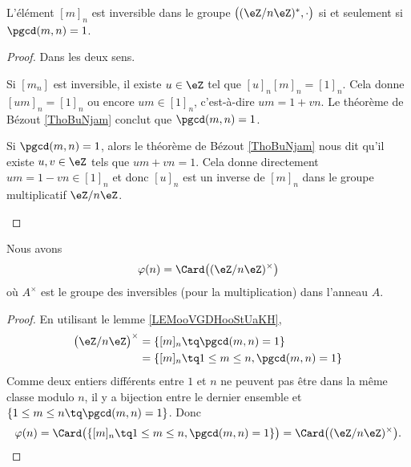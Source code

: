 \begin{lemma}		\label{LEMooVGDHooStUaKH}
	L'élément \( [m]_n\) est inversible dans le groupe \( \big( (\eZ/n\eZ)^*,\cdot \big)\) si et seulement si \( \pgcd(m,n)=1\).
\end{lemma}

\begin{proof}
	Dans les deux sens.
	\begin{subproof}
		\spitem[\( \Rightarrow\)]
		Si \( [m_n]\) est inversible, il existe \( u\in \eZ\) tel que \( [u]_n[m]_n=[1]_n\). Cela donne \( [um]_n=[1]_n\) ou encore \( um\in [1]_n\), c'est-à-dire \( um=1+vn\). Le théorème de Bézout \ref{ThoBuNjam} conclut que \( \pgcd(m,n)=1\).

		\spitem[\( \Leftarrow\)]
		Si \( \pgcd(m,n)=1\), alors le théorème de Bézout \ref{ThoBuNjam} nous dit qu'il existe \( u,v\in \eZ\) tels que \( um+vn=1\). Cela donne directement \( um=1-vn\in [1]_n\) et donc \( [u]_n\) est un inverse de \( [m]_n\) dans le groupe multiplicatif \( \eZ/n\eZ\).
	\end{subproof}
\end{proof}

\begin{lemma}		\label{LEMooCLYEooONhWKs}
	Nous avons
	\begin{equation}
		\varphi(n)=\Card\big( (\eZ/n\eZ)^{\times} \big)
	\end{equation}
	où \( A^{\times}\) est le groupe des inversibles (pour la multiplication) dans l'anneau \( A\).
\end{lemma}

\begin{proof}
	En utilisant le lemme \ref{LEMooVGDHooStUaKH},
	\begin{subequations}
		\begin{align}
			\big( \eZ/n\eZ \big)^{\times} & =\{ [m]_n\tq \pgcd(m,n)=1 \}               \\
			                              & =\{ [m]_n\tq 1\leq m\leq n,\pgcd(m,n)=1 \}
		\end{align}
	\end{subequations}
	Comme deux entiers différents entre \( 1 \) et \( n\) ne peuvent pas être dans la même classe modulo \( n\), il y a bijection entre le dernier ensemble et \( \{ 1\leq m\leq n\tq \pgcd(m,n)=1 \}\). Donc
	\begin{equation}
		\varphi(n)=\Card\big( \{ [m]_n\tq 1\leq m\leq n,\pgcd(m,n)=1 \} \big)=\Card\big( (\eZ/n\eZ)^{\times} \big).
	\end{equation}
\end{proof}

